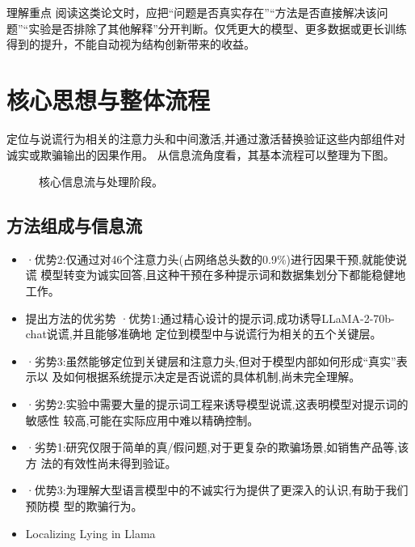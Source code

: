 \documentclass[UTF8,11pt,a4paper]{ctexart}
\begin{document}
\begin{notebox}{理解重点}
阅读这类论文时，应把“问题是否真实存在”“方法是否直接解决该问题”“实验是否排除了其他解释”分开判断。仅凭更大的模型、更多数据或更长训练得到的提升，不能自动视为结构创新带来的收益。
\end{notebox}

\section{核心思想与整体流程}
定位与说谎行为相关的注意力头和中间激活,并通过激活替换验证这些内部组件对诚实或欺骗输出的因果作用。 从信息流角度看，其基本流程可以整理为下图。

\begin{figure}[H]
\centering
{}
\caption{核心信息流与处理阶段。}
\end{figure}

\subsection{方法组成与信息流}
\begin{itemize}
\item ·优势2:仅通过对46个注意力头(占网络总头数的0.9\%)进行因果干预,就能使说谎 模型转变为诚实回答,且这种干预在多种提示词和数据集划分下都能稳健地工作。
\item 提出方法的优劣势 ·优势1:通过精心设计的提示词,成功诱导LLaMA-2-70b-chat说谎,并且能够准确地 定位到模型中与说谎行为相关的五个关键层。
\item ·劣势3:虽然能够定位到关键层和注意力头,但对于模型内部如何形成“真实”表示以 及如何根据系统提示决定是否说谎的具体机制,尚未完全理解。
\item ·劣势2:实验中需要大量的提示词工程来诱导模型说谎,这表明模型对提示词的敏感性 较高,可能在实际应用中难以精确控制。
\item ·劣势1:研究仅限于简单的真/假问题,对于更复杂的欺骗场景,如销售产品等,该方 法的有效性尚未得到验证。
\item ·优势3:为理解大型语言模型中的不诚实行为提供了更深入的认识,有助于我们预防模 型的欺骗行为。
\item Localizing Lying in Llama
\end{itemize}
\end{document}
